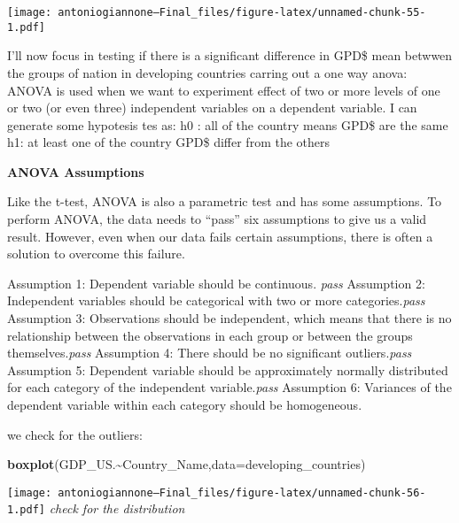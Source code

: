\documentclass[
]{article}
\newenvironment{Shaded}{\begin{snugshade}}{\end{snugshade}}
\newcommand{\AttributeTok}[1]{\textcolor[rgb]{0.13,0.29,0.53}{#1}}
\newcommand{\CommentTok}[1]{\textcolor[rgb]{0.56,0.35,0.01}{\textit{#1}}}
\newcommand{\FunctionTok}[1]{\textcolor[rgb]{0.13,0.29,0.53}{\textbf{#1}}}
\newcommand{\NormalTok}[1]{#1}
\newcommand{\OtherTok}[1]{\textcolor[rgb]{0.56,0.35,0.01}{#1}}
\newcommand{\SpecialCharTok}[1]{\textcolor[rgb]{0.81,0.36,0.00}{\textbf{#1}}}
\begin{document}
\texttt{[image: antoniogiannone---Final\_files/figure-latex/unnamed-chunk-55-1.pdf]}

I'll now focus in testing if there is a significant difference in GPD\$
mean betwwen the groups of nation in developing countries carring out a
one way anova: ANOVA is used when we want to experiment effect of two or
more levels of one or two (or even three) independent variables on a
dependent variable. I can generate some hypotesis tes as: h0 : all of
the country means GPD\$ are the same h1: at least one of the country
GPD\$ differ from the others

\textbf{ANOVA Assumptions}

Like the t-test, ANOVA is also a parametric test and has some
assumptions. To perform ANOVA, the data needs to ``pass'' six
assumptions to give us a valid result. However, even when our data fails
certain assumptions, there is often a solution to overcome this failure.

Assumption 1: Dependent variable should be continuous. \emph{pass}
Assumption 2: Independent variables should be categorical with two or
more categories.\emph{pass} Assumption 3: Observations should be
independent, which means that there is no relationship between the
observations in each group or between the groups themselves.\emph{pass}
Assumption 4: There should be no significant outliers.\emph{pass}
Assumption 5: Dependent variable should be approximately normally
distributed for each category of the independent variable.\emph{pass}
Assumption 6: Variances of the dependent variable within each category
should be homogeneous.

we check for the outliers:

\begin{Shaded}
\begin{Highlighting}[]
\FunctionTok{boxplot}\NormalTok{(GDP\_US.}\SpecialCharTok{\textasciitilde{}}\NormalTok{Country\_Name,}\AttributeTok{data=}\NormalTok{developing\_countries)}
\end{Highlighting}
\end{Shaded}

\texttt{[image: antoniogiannone---Final\_files/figure-latex/unnamed-chunk-56-1.pdf]}
\emph{check for the distribution}

\begin{Shaded}
\end{Shaded}
\end{document}
